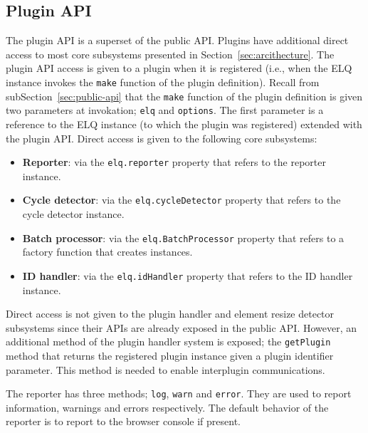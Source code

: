 \documentclass[a4paper,11pt]{kth-mag}
\newcommand{\code}[1]{\texttt{#1}}
\newcommand\abbr[2][]{\uppercase{#2}\ifthenelse{\equal{#1}{}}%
                     {}{#1}}
\begin{document}
      \subsection{Plugin API}\label{sec:plugin-api}
        The plugin \gls{API} is a superset of the public \gls{API}.
        Plugins have additional direct access to most core subsystems presented in Section~\ref{sec:arcithecture}.
        The plugin \gls{API} access is given to a plugin when it is registered (i.e., when the \abbr{elq} instance invokes the \code{make} function of the plugin definition).
        Recall from subSection~\ref{sec:public-api} that the \code{make} function of the plugin definition is given two parameters at invokation; \code{elq} and \code{options}.
        The first parameter is a reference to the \abbr{ELQ} instance (to which the plugin was registered) extended with the plugin \gls{API}.
        Direct access is given to the following core subsystems:
        \begin{itemize}
          \item \textbf{Reporter}: via the \code{elq.reporter} property that refers to the reporter instance.
          \item \textbf{Cycle detector}: via the \code{elq.cycleDetector} property that refers to the cycle detector instance.
          \item \textbf{Batch processor}: via the \code{elq.BatchProcessor} property that refers to a factory function that creates  instances.
          \item \textbf{\abbr{ID} handler}: via the \code{elq.idHandler} property that refers to the \abbr{ID} handler instance. 
        \end{itemize}
        Direct access is not given to the plugin handler and element resize detector subsystems since their \glspl{API} are already exposed in the public \gls{API}.
        However, an additional method of the plugin handler system is exposed; the \code{getPlugin} method that returns the registered plugin instance given a plugin identifier parameter.
        This method is needed to enable interplugin communications.

        The reporter has three methods; \code{log}, \code{warn} and \code{error}.
        They are used to report information, warnings and errors respectively.
        The default behavior of the reporter is to report to the browser console if present.
\end{document}
